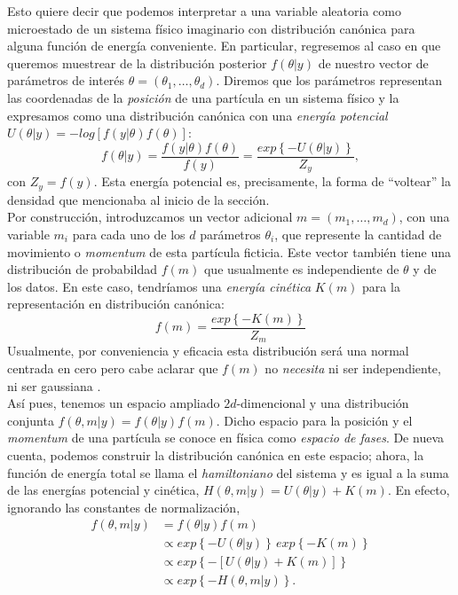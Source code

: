  Esto quiere decir que podemos interpretar a una variable aleatoria como microestado de un sistema físico imaginario con distribución canónica para alguna función de energía conveniente. En particular, regresemos al caso en que queremos muestrear de la distribución posterior $f(\theta|y)$ de nuestro vector de parámetros de interés $\theta = (\theta_1,\dots,\theta_d)$. Diremos que los parámetros representan las coordenadas de la \textit{posición} de una partícula en un sistema físico y la expresamos como una distribución canónica con una \textit{energía potencial} $U(\theta|y) = -log\left[f(y|\theta)f(\theta)\right]$: 
\begin{equation*}
 f(\theta|y)=\dfrac{f(y|\theta)f(\theta)}{f(y)}=\dfrac{exp\left\lbrace -U(\theta|y)\right\rbrace}{Z_y},
\end{equation*} 
con $Z_y = f(y)$. Esta energía potencial es, precisamente, la forma de ``voltear'' la densidad que mencionaba al inicio de la sección.\\
 
 Por construcción, introduzcamos un vector adicional $m = (m_1,\dots,m_d)$, con una variable $m_i$ para cada uno de los $d$ parámetros $\theta_i$, que represente la cantidad de movimiento o \textit{momentum} de esta partícula ficticia. Este vector también tiene una distribución de probabildad $f(m)$ que usualmente es independiente de $\theta$ y de los datos. En este caso, tendríamos una \textit{energía cinética} $K(m)$ para la representación en distribución canónica: 
 \begin{equation*}
f(m)=\dfrac{exp\left\lbrace -K(m)\right\rbrace}{Z_m}
 \end{equation*} 
 Usualmente, por conveniencia y eficacia esta distribución será una normal centrada en cero pero cabe aclarar que $f(m)$ no \textit{necesita} ni ser independiente, ni ser gaussiana \parencite{Betancourt17}.\\
 
 Así pues, tenemos un espacio ampliado $2d$-dimencional y una distribución conjunta $f(\theta,m|y)=f(\theta|y)f(m)$. Dicho espacio para la posición y el \textit{momentum} de una partícula se conoce en física como \textit{espacio de fases}. De nueva cuenta, podemos construir la distribución canónica en este espacio; ahora, la función de energía total se llama el \textit{hamiltoniano} del sistema y es igual a la suma de las energías potencial y cinética, $H(\theta,m|y) = U(\theta|y) + K(m)$. En efecto, ignorando las constantes de normalización, 
\begin{align*}
 f(\theta,m|y)&=f(\theta|y)f(m)\\
 &\propto exp\left\lbrace -U(\theta|y)\right\rbrace \, exp\left\lbrace -K(m)\right\rbrace\\
 &\propto exp\left\lbrace -\left[ U(\theta|y) + K(m)\right]\right\rbrace\\
 &\propto exp\left\lbrace -H(\theta,m|y)\right\rbrace.
\end{align*}
 
